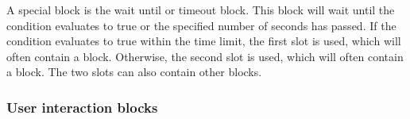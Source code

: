 \documentclass[../main]{subfiles}
\begin{document}
A special block is the wait until or timeout block.
This block will wait until the condition evaluates to true or the specified number of seconds has passed.
If the condition evaluates to true within the time limit, the first slot is used, which will often contain a  block.
Otherwise, the second slot is used, which will often contain a  block.
The two slots can also contain other blocks.

\subsubsection{User interaction blocks}

\begin{varwidth}{0.20\linewidth}
    \begin{scratch}[scale=0.6]
    \end{scratch}
\end{varwidth}%
\hspace{1em}%
\begin{varwidth}{0.28\linewidth}
    \begin{scratch}[scale=0.6]
    \end{scratch}
\end{varwidth}%
\hspace{1em}%
\begin{varwidth}{0.3\linewidth}
    \begin{scratch}[scale=0.6]
    \end{scratch}
\end{varwidth}

\begin{varwidth}{0.5\linewidth}
    \begin{scratch}[scale=0.6]
    \end{scratch}
\end{varwidth}%
\hspace{1em}%
\begin{varwidth}{0.5\linewidth}
    \begin{scratch}[scale=0.6]
    \end{scratch}
\end{varwidth}%
\end{document}
